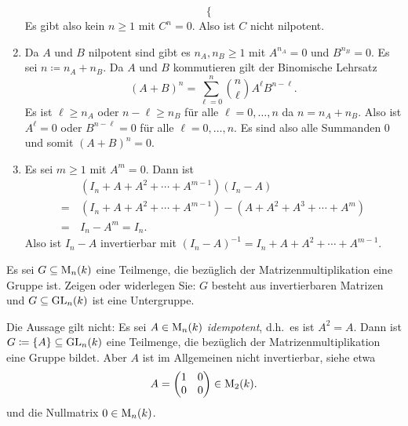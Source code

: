 \begin{solution}
\begin{enumerate}
\[\begin{cases}
    \end{cases}
   \]
   Es gibt also kein $n \geq 1$ mit $C^n = 0$. Also ist $C$ nicht nilpotent.
  \item
   Da $A$ und $B$ nilpotent sind gibt es $n_A, n_B \geq 1$ mit $A^{n_A} = 0$ und $B^{n_B} = 0$. Es sei $n \coloneqq n_A + n_B$. Da $A$ und $B$ kommutieren gilt der Binomische Lehrsatz
   \[
    (A+B)^n = \sum_{\ell=0}^n \binom{n}{\ell} A^\ell B^{n-\ell}.
   \]
   Es ist $\ell \geq n_A$ oder $n-\ell \geq n_B$ für alle $\ell = 0, \dotsc, n$ da $n = n_A + n_B$. Also ist $A^\ell = 0$ oder $B^{n-\ell} = 0$ für alle $\ell = 0, \dotsc, n$. Es sind also alle Summanden $0$ und somit $(A+B)^n = 0$.
  \item
   Es sei $m \geq 1$ mit $A^m = 0$. Dann ist
   \begin{align*}
     &\, (I_n + A + A^2 + \dotsb + A^{m-1}) (I_n - A) \\
    =&\, (I_n + A + A^2 + \dotsb + A^{m-1}) - (A + A^2 + A^3 + \dotsb + A^m) \\
    =&\, I_n - A^m
    = I_n.
   \end{align*}
   Also ist $I_n - A$ invertierbar mit $(I_n - A)^{-1} = I_n + A + A^2 + \dotsb + A^{m-1}$.
 \end{enumerate}
\end{solution}


\begin{question}
 Es sei $G \subseteq \operatorname{M}_n(k)$ eine Teilmenge, die bezüglich der Matrizenmultiplikation eine Gruppe ist. Zeigen oder widerlegen Sie: $G$ besteht aus invertierbaren Matrizen und $G \subseteq \operatorname{GL}_n(k)$ ist eine Untergruppe.
\end{question}
\begin{solution}
 Die Aussage gilt nicht: Es sei $A \in \operatorname{M}_n(k)$ \emph{idempotent}, d.h.\ es ist $A^2 = A$. Dann ist $G \coloneqq \{A\} \subseteq \operatorname{GL}_n(k)$ eine Teilmenge, die bezüglich der Matrizenmultiplikation eine Gruppe bildet. Aber $A$ ist im Allgemeinen nicht invertierbar, siehe etwa
 \[
  A = \begin{pmatrix} 1 & 0 \\ 0 & 0 \end{pmatrix} \in \operatorname{M}_2(k).
 \]
 und die Nullmatrix $0 \in \operatorname{M}_n(k)$.
\end{solution}














